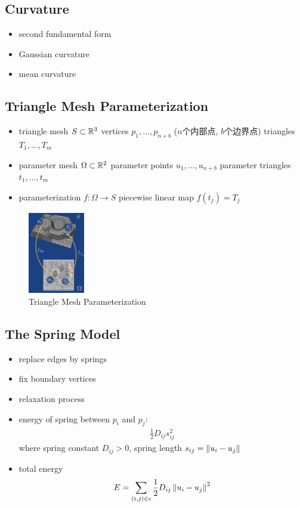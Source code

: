 \subsection{Curvature}
\begin{itemize}
    \item second fundamental form
    \item Gaussian curvature
    \item mean curvature
\end{itemize}

\subsection{Triangle Mesh Parameterization}
\begin{itemize}
    \item triangle mesh $S\subset \mathbb{R}^3$
    \subitem vertices $p_1,\dots,p_{n+b}$ ($n$个内部点, $b$个边界点)
    \subitem triangles $T_1,\dots,T_m$
    \item parameter mesh $\Omega\subset \mathbb{R}^2$
    \subitem parameter points $u_1,\dots,u_{n+b}$ 
    \subitem parameter triangles $t_1,\dots,t_m$
    \item parameterization $f:\Omega\to S$
    \subitem piecewise linear map $f(t_j)=T_j$
\end{itemize}
\begin{figure}[!htb]
    \centering
    \includegraphics[width=0.22\textwidth]{pic/ACG2/Triangle Mesh Parameterization}
    \caption{Triangle Mesh Parameterization}
\end{figure}

\subsection{The Spring Model}
\begin{itemize}
    \item replace edges by springs
    \item fix boundary vertices
    \item relaxation process
    \item energy of spring between $p_i$ and $p_j$: 
    \begin{align*}
        \frac{1}{2}D_{ij}s_{ij}^2
    \end{align*}
    where spring constant $D_{ij}>0$, spring length $s_{ij}=\left\lVert u_i-u_j\right\rVert$
    \item total energy 
    \begin{align*}
        E=\sum_{(i,j)\in\epsilon}\frac{1}{2}D_{ij}\left\lVert u_i-u_j\right\rVert^2
    \end{align*}
\end{itemize}

